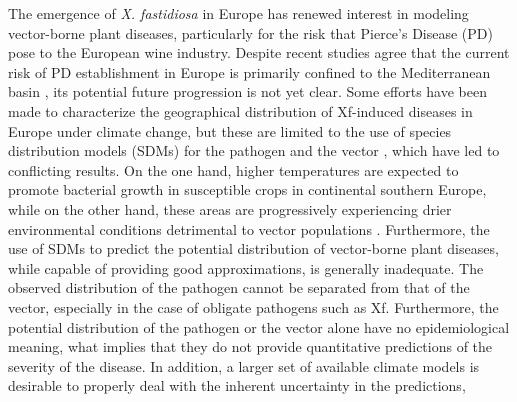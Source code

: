 The emergence of \textit{X. fastidiosa} in Europe has renewed interest in
modeling vector-borne plant diseases, particularly for the risk that Pierce's
Disease (PD) pose to the European wine industry. Despite recent studies agree
that the current risk of PD establishment in Europe is primarily confined to
the Mediterranean basin
\cite{godefroid2019xylella,Godefroid2022_vector,GimenezRomero2022_CommsBio},
its potential future progression is not yet clear. Some efforts have been made
to characterize the geographical distribution of Xf-induced diseases in Europe
under climate change, but these are limited to the use of species distribution
models (SDMs) for the pathogen \cite{Bosso2016b,Schneider2020,Godefroid2022}
and the vector \cite{Godefroid2022_vector}, which have led to conflicting
results. On the one hand, higher temperatures are expected to promote bacterial
growth in susceptible crops in continental southern Europe, while on the other
hand, these areas are progressively experiencing drier environmental conditions
detrimental to vector populations \cite{Godefroid2022_vector}. Furthermore, the
use of SDMs to predict the potential distribution of vector-borne plant
diseases, while capable of providing good approximations, is generally
inadequate. The observed distribution of the pathogen cannot be separated from
that of the vector, especially in the case of obligate pathogens such as Xf.
Furthermore, the potential distribution of the pathogen or the vector alone
have no epidemiological meaning, what implies that they do not provide
quantitative predictions of the severity of the disease. In addition, a larger
set of available climate models is desirable to properly deal with the inherent
uncertainty in the predictions,

